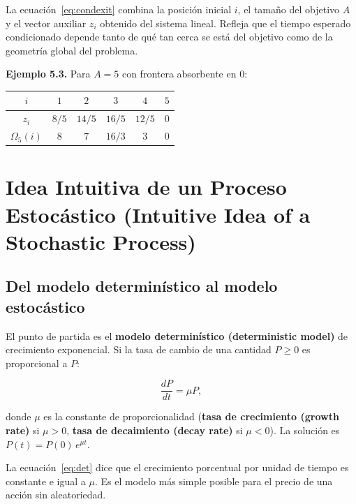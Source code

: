 \documentclass[12pt]{article}
\begin{document}
\begin{intuicionmat}
La ecuaci\'on~\eqref{eq:condexit} combina la posici\'on inicial $i$, el tama\~no
del objetivo $A$ y el vector auxiliar $z_i$ obtenido del sistema lineal.
Refleja que el tiempo esperado condicionado depende tanto de qu\'e tan cerca
se est\'a del objetivo como de la geometr\'ia global del problema.
\end{intuicionmat}

\textbf{Ejemplo 5.3.} Para $A = 5$ con frontera absorbente en $0$:

\begin{center}
\begin{tabular}{c|ccccc}
  \toprule
  $i$ & $1$ & $2$ & $3$ & $4$ & $5$ \\
  \midrule
  $z_i$ & $8/5$ & $14/5$ & $16/5$ & $12/5$ & $0$ \\
  $\Omega_5(i)$ & $8$ & $7$ & $16/3$ & $3$ & $0$ \\
  \bottomrule
\end{tabular}
\end{center}

\section{Idea Intuitiva de un Proceso Estoc\'astico (Intuitive Idea of a Stochastic Process)}

\subsection{Del modelo determin\'istico al modelo estoc\'astico}

El punto de partida es el \textbf{modelo determin\'istico (deterministic model)} de
crecimiento exponencial. Si la tasa de cambio de una cantidad $P \geq 0$ es
proporcional a $P$:

\begin{equation}
  \frac{dP}{dt} = \mu P,
  \label{eq:det}
\end{equation}

donde $\mu$ es la constante de proporcionalidad (\textbf{tasa de crecimiento (growth rate)}
si $\mu > 0$, \textbf{tasa de decaimiento (decay rate)} si $\mu < 0$).
La soluci\'on es $P(t) = P(0)\,e^{\mu t}$.

\begin{intuicionmat}
La ecuaci\'on~\eqref{eq:det} dice que el crecimiento porcentual por unidad de tiempo
es constante e igual a $\mu$. Es el modelo m\'as simple posible para el
precio de una acci\'on sin aleatoriedad.
\end{intuicionmat}
\end{document}

